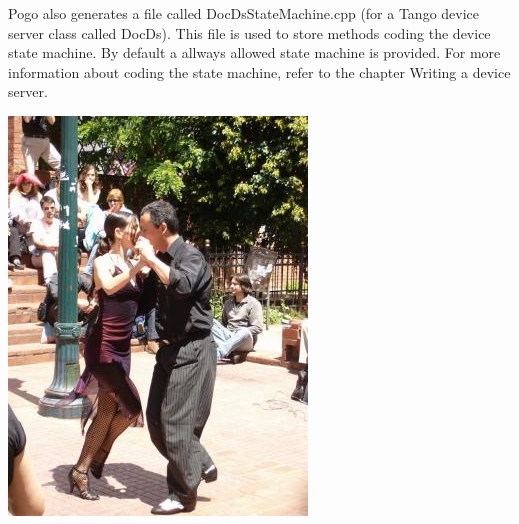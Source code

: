 Pogo also generates a file called \textquotedbl{}DocDsStateMachine.cpp\textquotedbl{}
(for a Tango device server class called DocDs). This file is used
to store methods coding the device state machine. By default a allways
allowed state machine is provided. For more information about coding
the state machine, refer to the chapter \textquotedbl{}Writing a device
server\textquotedbl{}.

\newpage{}

\vspace{5cm}

\begin{center}
\label{APicture}\includegraphics{dance/tg_argentine}
\par\end{center}
